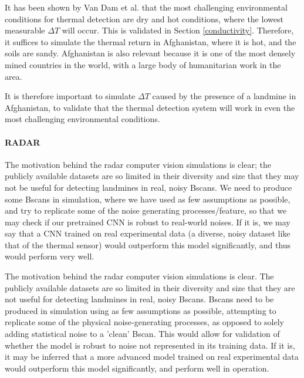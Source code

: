             It has been shown by Van Dam et al. \cite{van2003effects} that the most challenging environmental conditions for thermal detection are dry and hot conditions, where the lowest measurable \(\Delta T\) will occur. This is validated in Section \ref{conductivity}. Therefore, it suffices to simulate the thermal return in Afghanistan, where it is hot, and the soils are sandy. Afghanistan is also relevant because it is one of the most densely mined countries in the world, with a large body of humanitarian work in the area.
            
            It is therefore important to simulate \(\Delta T\) caused by the presence of a landmine in Afghanistan, to validate that the thermal detection system will work in even the most challenging environmental conditions.
        
        \paragraph{RADAR} 
        
            The motivation behind the radar computer vision simulations is clear; the publicly available datasets are so limited in their diversity and size that they may not be useful for detecting landmines in real, noisy Bscans. We need to produce some Bscans in simulation, where we have used as few assumptions as possible, and try to replicate some of the noise generating processes/feature, so that we may check if our pretrained CNN is robust to real-world noises. If it is, we may say that a CNN trained on real experimental data (a diverse, noisy dataset like that of the thermal sensor) would outperform this model significantly, and thus would perform very well.

            \noindent The motivation behind the radar computer vision simulations is clear. The publicly available datasets are so limited in their diversity and size that they are not useful for detecting landmines in real, noisy Bscans. Bscans need to be produced in simulation using as few assumptions as possible, attempting to replicate some of the physical noise-generating processes, as opposed to solely adding statistical noise to a 'clean' Bscan. 
            This would allow for validation of whether the model is robust to noise not represented in its training data. If it is, it may be inferred that a more advanced model trained on real experimental data would outperform this model significantly, and perform well in operation.
    
    
    